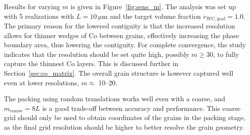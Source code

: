 \documentclass[3p,12pt]{elsarticle}
\newcommand{\WC}{\mathrm{WC}}
\begin{document}
Results for varying $m$ is given in Figure~\ref{fig:sens_m}.
The analysis was set up with 5 realizations with $L = \SI{10}{\micro\meter}$ and the target volume fraction $v_{\WC,\text{goal}} = 1.0$.
The primary reason for the lowered contiguity is that the increased resolution allows for thinner wedges of Co between grains, effectively increasing the phase boundary area, thus lowering the contiguity.
For complete convergence, the study indicates that the resolution should be set quite high, possibly $m \geq 30$, to fully capture the thinnest Co layers.
This is discussed further in Section~\ref{sec:co_matrix}.
The overall grain structure is however captured well even at lower resolutions, $m \approx $ 10--20.

The packing using random translations works well even with a coarse, and $m_\text{coarse} = 8 L$ is a good trade-off between accuracy and performance.
This coarse grid should only be used to obtain coordinates of the grains in the packing stage, as the final grid resolution should be higher to better resolve the grain geometry.
\end{document}
